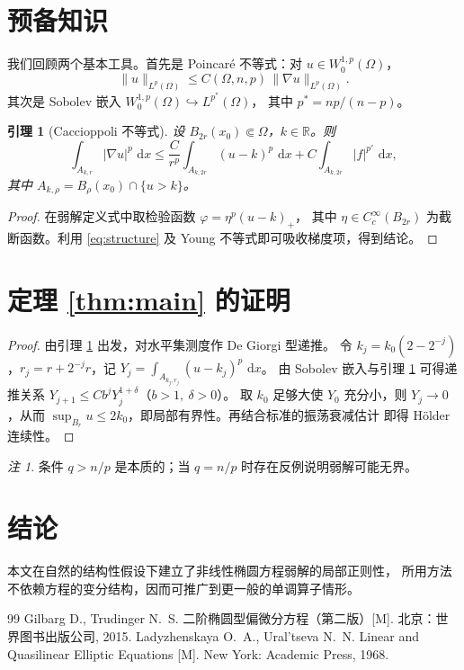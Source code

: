 \documentclass[12pt,a4paper,UTF8,fontset=fandol]{ctexart}
\newtheorem{lemma}[theorem]{引理}
\theoremstyle{definition}
\theoremstyle{remark}
\newtheorem{remark}[theorem]{注}
\newcommand{\R}{\mathbb{R}}
\newcommand{\Om}{\Omega}
\newcommand{\dd}{\,\mathrm{d}}
\begin{document}
\section{预备知识}

我们回顾两个基本工具。首先是 Poincaré 不等式：对 $u\in W^{1,p}_0(\Om)$，
\begin{equation}\label{eq:poincare}
  \|u\|_{L^p(\Om)} \le C(\Om,n,p)\,\|\nabla u\|_{L^p(\Om)} .
\end{equation}
其次是 Sobolev 嵌入 $W^{1,p}_0(\Om)\hookrightarrow L^{p^*}(\Om)$，
其中 $p^*=np/(n-p)$。

\begin{lemma}[Caccioppoli 不等式]\label{lem:cacc}
设 $B_{2r}(x_0)\Subset\Om$，$k\in\R$。则
\begin{equation}
  \int_{A_{k,r}}|\nabla u|^p\,\dd x
  \le \frac{C}{r^p}\int_{A_{k,2r}}(u-k)^p\,\dd x
      + C\int_{A_{k,2r}}|f|^{p'}\,\dd x ,
\end{equation}
其中 $A_{k,\rho}=B_\rho(x_0)\cap\{u>k\}$。
\end{lemma}

\begin{proof}
在弱解定义式中取检验函数 $\varphi=\eta^p(u-k)_+$，
其中 $\eta\in C_c^\infty(B_{2r})$ 为截断函数。利用 \eqref{eq:structure}
及 Young 不等式即可吸收梯度项，得到结论。
\end{proof}

\section{定理 \ref{thm:main} 的证明}

\begin{proof}
由引理 \ref{lem:cacc} 出发，对水平集测度作 De Giorgi 型递推。
令 $k_j=k_0(2-2^{-j})$，$r_j=r+2^{-j}r$，记
$Y_j=\int_{A_{k_j,r_j}}(u-k_j)^p\,\dd x$。
由 Sobolev 嵌入与引理 \ref{lem:cacc} 可得递推关系
$Y_{j+1}\le C b^j Y_j^{1+\delta}$（$b>1,\ \delta>0$）。
取 $k_0$ 足够大使 $Y_0$ 充分小，则 $Y_j\to0$，从而
$\sup_{B_r}u\le 2k_0$，即局部有界性。再结合标准的振荡衰减估计
即得 Hölder 连续性。
\end{proof}

\begin{remark}
条件 $q>n/p$ 是本质的；当 $q=n/p$ 时存在反例说明弱解可能无界。
\end{remark}

\section{结论}

本文在自然的结构性假设下建立了非线性椭圆方程弱解的局部正则性，
所用方法不依赖方程的变分结构，因而可推广到更一般的单调算子情形。

\bigskip
\begin{thebibliography}{99}
 Gilbarg D., Trudinger N.~S. 二阶椭圆型偏微分方程（第二版）[M].
北京：世界图书出版公司, 2015.
 Ladyzhenskaya O.~A., Ural'tseva N.~N. Linear and Quasilinear
Elliptic Equations [M]. New York: Academic Press, 1968.
\end{thebibliography}
\end{document}
